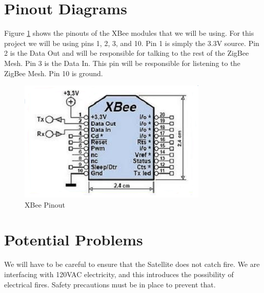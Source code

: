 \section{Pinout Diagrams}
Figure \ref{XBeePinout} shows the pinouts of the XBee modules that
we will be using. For this project we will be using pins 1, 2, 3, and 10.
Pin 1 is simply the 3.3V source. Pin 2 is the Data Out and will be 
responsible for talking to the rest of the ZigBee Mesh. Pin 3 is the 
Data In. This pin will be responsible for listening to the ZigBee Mesh.
Pin 10 is ground.

\begin{figure}[H]
\centering
\includegraphics[scale=1.0]{Hardware/images/XBeePinout.png}
\caption{XBee Pinout}
\label{XBeePinout}
\end{figure}

\section{Potential Problems}

We will have to be careful to ensure that the Satellite does 
not catch fire. We are interfacing with 120VAC electricity, and 
this introduces the possibility of electrical fires. 
Safety precautions must be in place to prevent that. 